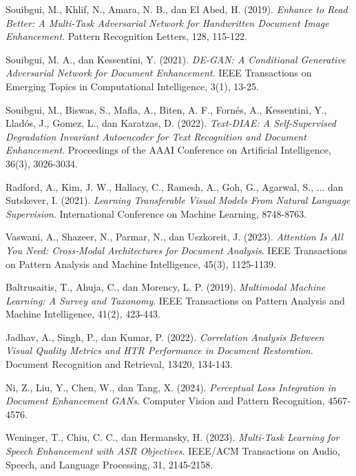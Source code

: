 \documentclass[12pt,a4paper]{article}
\begin{document}
\begin{thebibliography}{plain}
\setlength{\itemsep}{0.2cm}

Souibgui, M., Khlif, N., Amara, N. B., dan El Abed, H. (2019).
\textit{Enhance to Read Better: A Multi-Task Adversarial Network for Handwritten Document Image Enhancement}.
Pattern Recognition Letters, 128, 115-122.

Souibgui, M. A., dan Kessentini, Y. (2021).
\textit{DE-GAN: A Conditional Generative Adversarial Network for Document Enhancement}.
IEEE Transactions on Emerging Topics in Computational Intelligence, 3(1), 13-25.

Souibgui, M., Biswas, S., Mafla, A., Biten, A. F., Fornés, A., Kessentini, Y., Lladós, J., Gomez, L., dan Karatzas, D. (2022).
\textit{Text-DIAE: A Self-Supervised Degradation Invariant Autoencoder for Text Recognition and Document Enhancement}.
Proceedings of the AAAI Conference on Artificial Intelligence, 36(3), 3026-3034.

Radford, A., Kim, J. W., Hallacy, C., Ramesh, A., Goh, G., Agarwal, S., ... dan Sutskever, I. (2021).
\textit{Learning Transferable Visual Models From Natural Language Supervision}.
International Conference on Machine Learning, 8748-8763.

Vaswani, A., Shazeer, N., Parmar, N., dan Uszkoreit, J. (2023).
\textit{Attention Is All You Need: Cross-Modal Architectures for Document Analysis}.
IEEE Transactions on Pattern Analysis and Machine Intelligence, 45(3), 1125-1139.

Baltrusaitis, T., Ahuja, C., dan Morency, L. P. (2019).
\textit{Multimodal Machine Learning: A Survey and Taxonomy}.
IEEE Transactions on Pattern Analysis and Machine Intelligence, 41(2), 423-443.

Jadhav, A., Singh, P., dan Kumar, P. (2022).
\textit{Correlation Analysis Between Visual Quality Metrics and HTR Performance in Document Restoration}.
Document Recognition and Retrieval, 13420, 134-143.

Ni, Z., Liu, Y., Chen, W., dan Tang, X. (2024).
\textit{Perceptual Loss Integration in Document Enhancement GANs}.
Computer Vision and Pattern Recognition, 4567-4576.

Weninger, T., Chiu, C. C., dan Hermansky, H. (2023).
\textit{Multi-Task Learning for Speech Enhancement with ASR Objectives}.
IEEE/ACM Transactions on Audio, Speech, and Language Processing, 31, 2145-2158.


\end{thebibliography}
\end{document}
